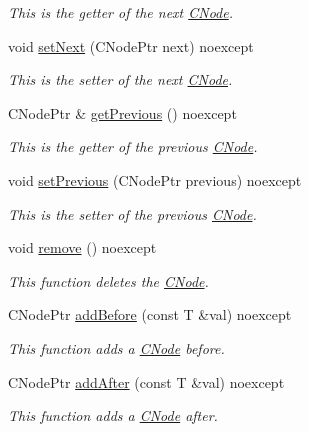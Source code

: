 \begin{DoxyCompactItemize}
\begin{DoxyCompactList}\small\item\em This is the getter of the next \hyperlink{classnsSdD_1_1CList_1_1CNode}{C\+Node}. \end{DoxyCompactList}\item 
void \hyperlink{classnsSdD_1_1CList_1_1CNode_a4fbf927c2450610ac535f3df31f7c63e}{set\+Next} (C\+Node\+Ptr next) noexcept
\begin{DoxyCompactList}\small\item\em This is the setter of the next \hyperlink{classnsSdD_1_1CList_1_1CNode}{C\+Node}. \end{DoxyCompactList}\item 
\hypertarget{classnsSdD_1_1CList_1_1CNode_ab49edf2b1fe7f85f6486548b0ee086b4}{C\+Node\+Ptr \& \hyperlink{classnsSdD_1_1CList_1_1CNode_ab49edf2b1fe7f85f6486548b0ee086b4}{get\+Previous} () noexcept}\label{classnsSdD_1_1CList_1_1CNode_ab49edf2b1fe7f85f6486548b0ee086b4}

\begin{DoxyCompactList}\small\item\em This is the getter of the previous \hyperlink{classnsSdD_1_1CList_1_1CNode}{C\+Node}. \end{DoxyCompactList}\item 
void \hyperlink{classnsSdD_1_1CList_1_1CNode_a9c39d8affa969f5498f49d6693b61fd5}{set\+Previous} (C\+Node\+Ptr previous) noexcept
\begin{DoxyCompactList}\small\item\em This is the setter of the previous \hyperlink{classnsSdD_1_1CList_1_1CNode}{C\+Node}. \end{DoxyCompactList}\item 
\hypertarget{classnsSdD_1_1CList_1_1CNode_a3ede1d2dc1fab637b77ae489ddb05c64}{void \hyperlink{classnsSdD_1_1CList_1_1CNode_a3ede1d2dc1fab637b77ae489ddb05c64}{remove} () noexcept}\label{classnsSdD_1_1CList_1_1CNode_a3ede1d2dc1fab637b77ae489ddb05c64}

\begin{DoxyCompactList}\small\item\em This function deletes the \hyperlink{classnsSdD_1_1CList_1_1CNode}{C\+Node}. \end{DoxyCompactList}\item 
C\+Node\+Ptr \hyperlink{classnsSdD_1_1CList_1_1CNode_a5c11b581e59233a828fb5618b36f1457}{add\+Before} (const T \&val) noexcept
\begin{DoxyCompactList}\small\item\em This function adds a \hyperlink{classnsSdD_1_1CList_1_1CNode}{C\+Node} before. \end{DoxyCompactList}\item 
C\+Node\+Ptr \hyperlink{classnsSdD_1_1CList_1_1CNode_ab18a47c21c385ce5072df88c831c523e}{add\+After} (const T \&val) noexcept
\begin{DoxyCompactList}\small\item\em This function adds a \hyperlink{classnsSdD_1_1CList_1_1CNode}{C\+Node} after. \end{DoxyCompactList}\end{DoxyCompactItemize}


